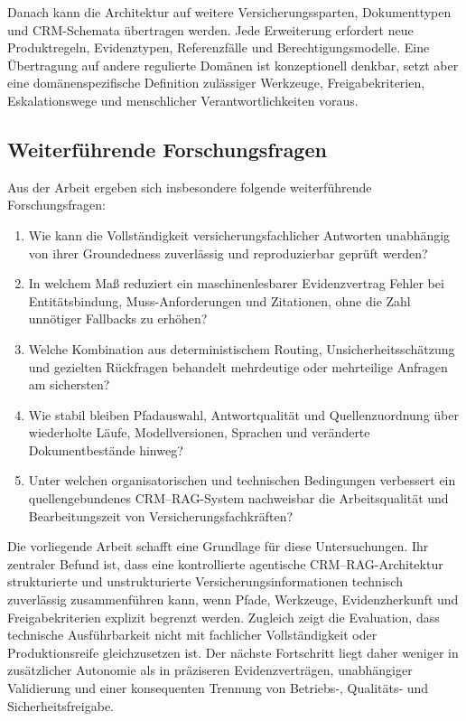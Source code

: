 Danach kann die Architektur auf weitere Versicherungssparten, Dokumenttypen und CRM-Schemata übertragen werden. Jede Erweiterung erfordert neue Produktregeln, Evidenztypen, Referenzfälle und Berechtigungsmodelle. Eine Übertragung auf andere regulierte Domänen ist konzeptionell denkbar, setzt aber eine domänenspezifische Definition zulässiger Werkzeuge, Freigabekriterien, Eskalationswege und menschlicher Verantwortlichkeiten voraus.

\subsection{Weiterführende Forschungsfragen}

Aus der Arbeit ergeben sich insbesondere folgende weiterführende Forschungsfragen:

\begin{enumerate}
    \item Wie kann die Vollständigkeit versicherungsfachlicher Antworten unabhängig von ihrer Groundedness zuverlässig und reproduzierbar geprüft werden?
    \item In welchem Maß reduziert ein maschinenlesbarer Evidenzvertrag Fehler bei Entitätsbindung, Muss-Anforderungen und Zitationen, ohne die Zahl unnötiger Fallbacks zu erhöhen?
    \item Welche Kombination aus deterministischem Routing, Unsicherheitsschätzung und gezielten Rückfragen behandelt mehrdeutige oder mehrteilige Anfragen am sichersten?
    \item Wie stabil bleiben Pfadauswahl, Antwortqualität und Quellenzuordnung über wiederholte Läufe, Modellversionen, Sprachen und veränderte Dokumentbestände hinweg?
    \item Unter welchen organisatorischen und technischen Bedingungen verbessert ein quellengebundenes CRM--RAG-System nachweisbar die Arbeitsqualität und Bearbeitungszeit von Versicherungsfachkräften?
\end{enumerate}

Die vorliegende Arbeit schafft eine Grundlage für diese Untersuchungen. Ihr zentraler Befund ist, dass eine kontrollierte agentische CRM--RAG-Architektur strukturierte und unstrukturierte Versicherungsinformationen technisch zuverlässig zusammenführen kann, wenn Pfade, Werkzeuge, Evidenzherkunft und Freigabekriterien explizit begrenzt werden. Zugleich zeigt die Evaluation, dass technische Ausführbarkeit nicht mit fachlicher Vollständigkeit oder Produktionsreife gleichzusetzen ist. Der nächste Fortschritt liegt daher weniger in zusätzlicher Autonomie als in präziseren Evidenzverträgen, unabhängiger Validierung und einer konsequenten Trennung von Betriebs-, Qualitäts- und Sicherheitsfreigabe.
